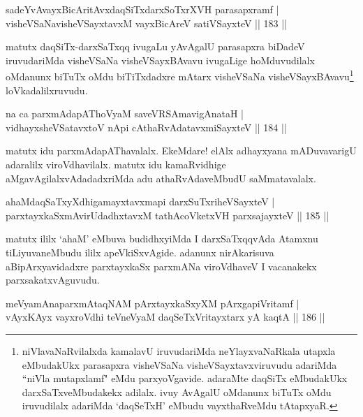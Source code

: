 
\begin{shl}
sadeYvAvayxBicAritAvxdaqSiTxdarxSoTxrXVH parasapxramf |\\
visheVSaNavisheVSayxtavxM vayxBicAreV satiVSayxteV \hfill || 183 ||
\end{shl}

\begin{artha}
matutx daqSiTx-darxSaTxqq ivugaLu yAvAgalU parasapxra biDadeV iruvudariMda visheVSaNa visheVSayxBAvavu ivugaLige hoMduvudilalx oMdanunx biTuTx oMdu biTiTxdadxre mAtarx visheVSaNa visheVSayxBAvavu\footnote{niVlavaNaRvilalxda kamalavU iruvudariMda neYlayxvaNaRkala utapxla eMbudakUkx parasapxra visheVSaNa visheVSayxtavxviruvudu adariMda ``niVla mutapxlamf" eMdu parxyoVgavide. adaraMte daqSiTx eMbudakUkx darxSaTxveMbudakekx adilalx. ivuy AvAgalU oMdanunx biTuTx oMdu iruvudilalx adariMda `daqSeTxH' eMbudu vayxthaRveMdu tAtapxyaR.} loVkadalilxruvudu.
\end{artha}

\begin{shl}
na ca parxmAdapAThoV\s yaM saveVRSAmavigAnataH |\\
vidhayxsheVSatavxtoV nApi cAthaRvAdatavxmiSayxteV \hfill || 184 ||
\end{shl}	

\begin{artha}
matutx idu parxmAdapAThavalalx. EkeMdare! elAlx adhayxyana mADuvavarigU adaralilx viroVdhavilalx. matutx idu kamaRvidhige aMgavAgilalxvAdadadxriMda adu athaRvAdaveMbudU saMmatavalalx.
\end{artha}


\begin{shl}
ahaMdaqSaTxyXdhigamayxtavxmapi darxSuTxriheVSayxteV |\\
parxtayxkaSxmAvirUdadhxtavxM tathAcoVketxVH parxsajayxteV \hfill || 185 ||
\end{shl}

\begin{artha}
matutx ililx `ahaM' eMbuva budidhxyiMda I darxSaTxqqvAda Atamxnu tiLiyuvaneMbudu ililx apeVkiSxvAgide. adanunx nirAkarisuva aBipArxyavidadxre parxtayxkaSx parxmANa viroVdhaveV I vacanakekx parxsakatxvAguvudu.
\end{artha}

\begin{shl}
meVyamAnaparxmAtaqNAM pArxtayxkaSxyXM pArxgapiVritamf |\\
vAyxKAyx vayxroVdhi teVneVyaM daqSeTxVritayxtarx yA kaqtA \hfill || 186 ||
\end{shl}

